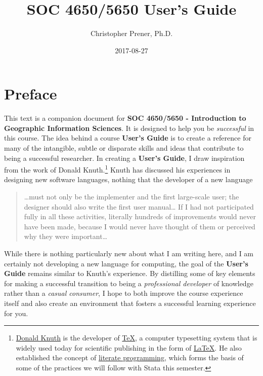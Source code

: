 \documentclass[]{book}
\title{SOC 4650/5650 User's Guide}
\author{Christopher Prener, Ph.D.}
\date{2017-08-27}
\let\rmarkdownfootnote\footnote%
\def\footnote{\protect\rmarkdownfootnote}
\theoremstyle{definition}
\theoremstyle{definition}
\theoremstyle{remark}
\begin{document}
\maketitle

{
\setcounter{tocdepth}{1}
\tableofcontents
}
\chapter*{Preface}\label{preface}

This text is a companion document for \textbf{SOC 4650/5650 -
Introduction to Geographic Information Sciences}. It is designed to help
you be \emph{successful} in this course. The idea behind a course
\textbf{User's Guide} is to create a reference for many of the
intangible, subtle or disparate skills and ideas that contribute to
being a successful researcher. In creating a \textbf{User's Guide}, I
draw inspiration from the work of Donald Knuth.\footnote{\href{https://en.wikipedia.org/wiki/Donald_Knuth}{Donald
  Knuth} is the developer of
  \href{https://en.wikipedia.org/wiki/TeX}{TeX}, a computer typesetting
  system that is widely used today for scientific publishing in the form
  of \href{https://en.wikipedia.org/wiki/LaTeX}{LaTeX}. He also
  established the concept of
  \href{https://en.wikipedia.org/wiki/Literate_programming}{literate
  programming}, which forms the basis of some of the practices we will
  follow with Stata this semester.} Knuth has discussed his experiences
in designing new software languages, nothing that the developer of a new
language

\begin{quote}
\ldots{}must not only be the implementer and the first large-scale user;
the designer should also write the first user manual\ldots{} If I had
not participated fully in all these activities, literally hundreds of
improvements would never have been made, because I would never have
thought of them or perceived why they were important\ldots{}
\end{quote}

While there is nothing particularly new about what I am writing here,
and I am certainly not developing a new language for computing, the goal
of the \textbf{User's Guide} remains similar to Knuth's experience. By
distilling some of key elements for making a successful transition to
being a \emph{professional developer} of knowledge rather than a
\emph{casual consumer}, I hope to both improve the course experience
itself and also create an environment that fosters a successful learning
experience for you.
\end{document}
